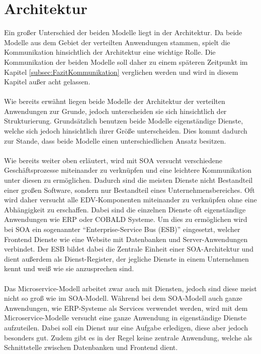 \section{Architektur}
\label{sec:FazitArchitektur}
Ein großer Unterschied der beiden Modelle liegt in der Architektur. Da beide Modelle aus dem Gebiet der verteilten Anwendungen stammen, spielt die Kommunikation hinsichtlich der Architektur eine wichtige Rolle. Die Kommunikation der beiden Modelle soll daher zu einem späteren Zeitpunkt im Kapitel \ref{subsec:FazitKommunikation}  verglichen werden und wird in diesem Kapitel außer acht gelassen.
\\\\
Wie bereits erwähnt liegen beide Modelle der Architektur der verteilten Anwendungen zur Grunde, jedoch unterscheiden sie sich hinsichtlich der Strukturierung. Grundsätzlich benutzen beide Modelle eigenständige Dienste, welche sich jedoch hinsichtlich ihrer Größe unterscheiden. Dies kommt dadurch zur Stande, dass beide Modelle einen unterschiedlichen Ansatz besitzen.
\\\\
Wie bereits weiter oben erläutert, wird mit SOA versucht verschiedene Geschäftsprozesse miteinander zu verknüpfen und eine leichtere Kommunikation unter diesen zu ermöglichen. Dadurch sind die meisten Dienste nicht  Bestandteil einer großen Software, sondern nur Bestandteil eines Unternehmensbereiches. Oft wird daher versucht alle EDV-Komponenten miteinander zu verknüpfen ohne eine Abhängigkeit zu erschaffen. Dabei sind die einzelnen Dienste oft eigenständige Anwendungen wie ERP oder COBALD Systeme. Um dies zu ermöglichen wird bei SOA ein sogenannter "`Enterprise-Service Bus (ESB)"' eingesetzt, welcher Frontend Dienste wie eine Website mit Datenbanken und Server-Anwendungen verbindet. Der ESB bildet dabei die Zentrale Einheit einer SOA-Architektur und dient außerdem als Dienst-Register, der jegliche Dienste in einem Unternehmen kennt und weiß wie sie anzusprechen sind.
\\\\
Das Microservice-Modell arbeitet zwar auch mit Diensten, jedoch sind diese meist nicht so groß wie im SOA-Modell. Während bei dem SOA-Modell auch ganze Anwendungen, wie ERP-Systeme als Services verwendet werden, wird mit dem Microservice-Modelle versucht eine ganze Anwendung in eigenständige  Dienste aufzuteilen. Dabei soll ein Dienst nur eine Aufgabe erledigen, diese aber jedoch besonders gut. Zudem gibt es in der Regel keine zentrale Anwendung, welche als Schnittstelle zwischen Datenbanken und Frontend dient.


